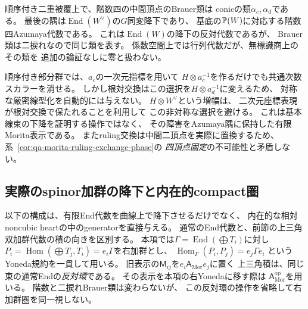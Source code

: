 \begin{remark}[頂点Brauer類と増幅の役割]
\label{rem:qa-rank45-polarization-brauer}
順序付き二重被覆上で、階数四の中間頂点のBrauer類は
conicの類$\alpha_c,\alpha_d$である。
最後の隅は$\operatorname{End}(W^\vee)$の$G$同変降下であり、
基底の$\mathbb P(W)$に対応する階数四Azumaya代数である。
これは$\operatorname{End}(W)$の降下の反対代数であるが、
Brauer類は二捩れなので同じ類を表す。
係数空間上では行列代数だが、無標識商上のその類を
追加の論証なしに零と扱わない。

順序付き部分群では、$a_c$の一次元指標を用いて
$H\otimes a_c^{-1}$を作るだけでも共通次数スカラーを消せる。
しかし根対交換はこの選択を$H\otimes a_d^{-1}$に変えるため、
対称な厳密線型化を自動的には与えない。
$H\otimes W^\vee$という増幅は、
二次元座標表現が根対交換で保たれることを利用して
この非対称な選択を避ける。
これは基本線束の下降を証明する操作ではなく、
その障害をAzumaya隅に保持した有限Morita表示である。
またruling交換は中間二頂点を実際に置換するため、
系~\ref{cor:qa-morita-ruling-exchange-phase}の
\emph{四頂点固定}の不可能性と矛盾しない。
\end{remark}


\subsection{実際のspinor加群の降下と内在的compact圏}
\label{subsec:qa-symmetric-spinor-gluing}

以下の構成は、有限End代数を曲線上で降下させるだけでなく、
内在的な相対noncubic heartの中のgeneratorを直接与える。
通常のEnd代数と、前節の上三角双加群代数の積の向きを区別する。
本項では$\Gamma=\operatorname{End}(\bigoplus T_i)$に対し
$P_i=\operatorname{Hom}(\bigoplus T_j,T_i)=e_i\Gamma$を右加群とし、
$\operatorname{Hom}_\Gamma(P_i,P_j)=e_j\Gamma e_i$
というYoneda規約を一貫して用いる。
旧表示の$\mathsf M_{ij}$を$e_i\mathsf A_{\mathrm{Mor}}e_j$に置く
上三角積は、同じ束の通常Endの\emph{反対環}である。
その表示を本項の右Yonedaに移す際は
$\mathsf A_{\mathrm{Mor}}^{\mathrm{op}}$を用いる。
階数と二捩れBrauer類は変わらないが、
この反対環の操作を省略して右加群圏を同一視しない。

